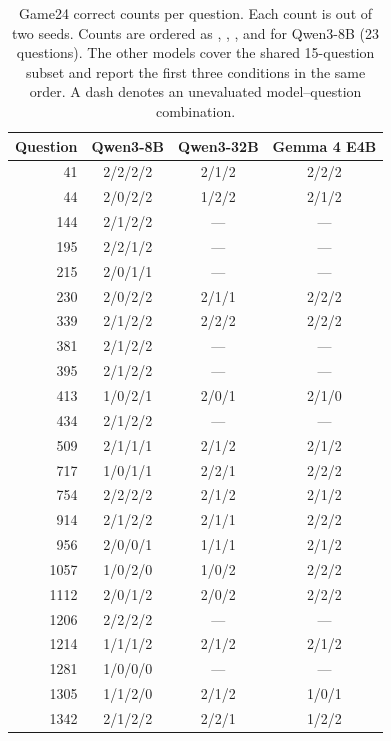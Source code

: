 \begin{table}[!t]
\centering
\caption{Game24 correct counts per question. Each count is out of two seeds. Counts are ordered as \clean{}, \fullaccess{}, \lateblock{}, and \pathblock{} for Qwen3-8B (23 questions). The other models cover the shared 15-question subset and report the first three conditions in the same order. A dash denotes an unevaluated model--question combination.}
\label{tab:game24-per-question}
\begin{tabular}{rccc}
\toprule
Question & Qwen3-8B & Qwen3-32B & Gemma 4 E4B \\
\midrule
41 & 2/2/2/2 & 2/1/2 & 2/2/2 \\
44 & 2/0/2/2 & 1/2/2 & 2/1/2 \\
144 & 2/1/2/2 & --- & --- \\
195 & 2/2/1/2 & --- & --- \\
215 & 2/0/1/1 & --- & --- \\
230 & 2/0/2/2 & 2/1/1 & 2/2/2 \\
339 & 2/1/2/2 & 2/2/2 & 2/2/2 \\
381 & 2/1/2/2 & --- & --- \\
395 & 2/1/2/2 & --- & --- \\
413 & 1/0/2/1 & 2/0/1 & 2/1/0 \\
434 & 2/1/2/2 & --- & --- \\
509 & 2/1/1/1 & 2/1/2 & 2/1/2 \\
717 & 1/0/1/1 & 2/2/1 & 2/2/2 \\
754 & 2/2/2/2 & 2/1/2 & 2/1/2 \\
914 & 2/1/2/2 & 2/1/1 & 2/2/2 \\
956 & 2/0/0/1 & 1/1/1 & 2/1/2 \\
1057 & 1/0/2/0 & 1/0/2 & 2/2/2 \\
1112 & 2/0/1/2 & 2/0/2 & 2/2/2 \\
1206 & 2/2/2/2 & --- & --- \\
1214 & 1/1/1/2 & 2/1/2 & 2/1/2 \\
1281 & 1/0/0/0 & --- & --- \\
1305 & 1/1/2/0 & 2/1/2 & 1/0/1 \\
1342 & 2/1/2/2 & 2/2/1 & 1/2/2 \\
\bottomrule
\end{tabular}
\end{table}
